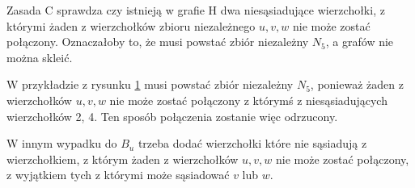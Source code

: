 Zasada C sprawdza czy istnieją w grafie H dwa niesąsiadujące wierzchołki, z którymi żaden z wierzchołków zbioru niezależnego $u, v, w$ nie może zostać połączony. 
Oznaczałoby to, że musi powstać zbiór niezależny $N_5$, a grafów nie można skleić.

W przykładzie z rysunku \ref{zasadaC1} musi powstać zbiór niezależny $N_5$, ponieważ żaden z wierzchołków $u, v, w$ nie może zostać połączony z którymś z niesąsiadujących 
wierzchołków 2, 4. Ten sposób połączenia zostanie więc odrzucony. 

\begin{figure}[H]
  \centering
 \caption{}
 \label{zasadaC1}
 \end{figure}

W innym wypadku do $B_u$ trzeba dodać wierzchołki które nie sąsiadują z wierzchołkiem, 
z którym żaden z wierzchołków $u, v, w$ nie może zostać połączony, z wyjątkiem tych z którymi może sąsiadować $v$ lub $w$.  \par

